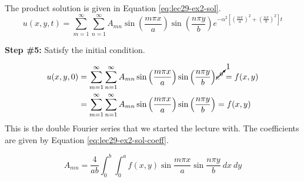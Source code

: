 \noindent The product solution is given in Equation \ref{eq:lec29-ex2-sol}.
\begin{equation}
u(x,y,t) = \sum\limits_{m=1}^{\infty} \sum\limits_{n=1}^{\infty} A_{mn} \sin{\left(\frac{m \pi x}{a}\right)} \sin{\left(\frac{n \pi y}{b}\right)}e^{-\alpha^2\left[\left(\frac{m \pi}{a}\right)^2 + \left(\frac{n \pi}{b} \right)^2 \right]t}
\label{eq:lec29-ex2-sol}
\end{equation}

\vspace{0.25cm}

\noindent\textbf{Step \#5:} Satisfy the initial condition.

\begin{align*}
u(x,y,0) &= \sum\limits_{m=1}^{\infty} \sum\limits_{n=1}^{\infty} A_{mn} \sin{\left(\frac{m \pi x}{a}\right)} \sin{\left(\frac{n \pi y}{b}\right)} \cancelto{1}{e^{0}} = f(x,y) \\
&=\sum\limits_{m=1}^{\infty} \sum\limits_{n=1}^{\infty} A_{mn} \sin{\left(\frac{m \pi x}{a}\right)} \sin{\left(\frac{n \pi y}{b}\right)} = f(x,y)
\end{align*}
This is the double Fourier series that we started the lecture with.  The coefficients are given by Equation \ref{eq:lec29-ex2-sol-coeff}.

\begin{equation}
A_{mn} = \frac{4}{a b} \int_0^b \int_0^a f(x,y) \sin{\frac{m \pi x}{a}} \sin{\frac{n \pi y}{b}} \ dx \ dy
\label{eq:lec29-ex2-sol-coeff}
\end{equation}

